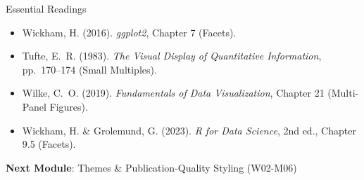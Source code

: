 \documentclass[10pt]{beamer}
\begin{document}
\begin{frame}{Essential Readings}
  \begin{itemize}
    \item Wickham, H. (2016). \emph{ggplot2}, Chapter 7 (Facets).
    \item Tufte, E.~R. (1983). \emph{The Visual Display of Quantitative
          Information}, pp.\ 170--174 (Small Multiples).
    \item Wilke, C.~O. (2019). \emph{Fundamentals of Data Visualization},
          Chapter 21 (Multi-Panel Figures).
    \item Wickham, H. \& Grolemund, G. (2023). \emph{R for Data Science},
          2nd ed., Chapter 9.5 (Facets).
  \end{itemize}
  \vspace{6pt}
  \textbf{Next Module}: Themes \& Publication-Quality Styling (W02-M06)
\end{frame}
\end{document}
